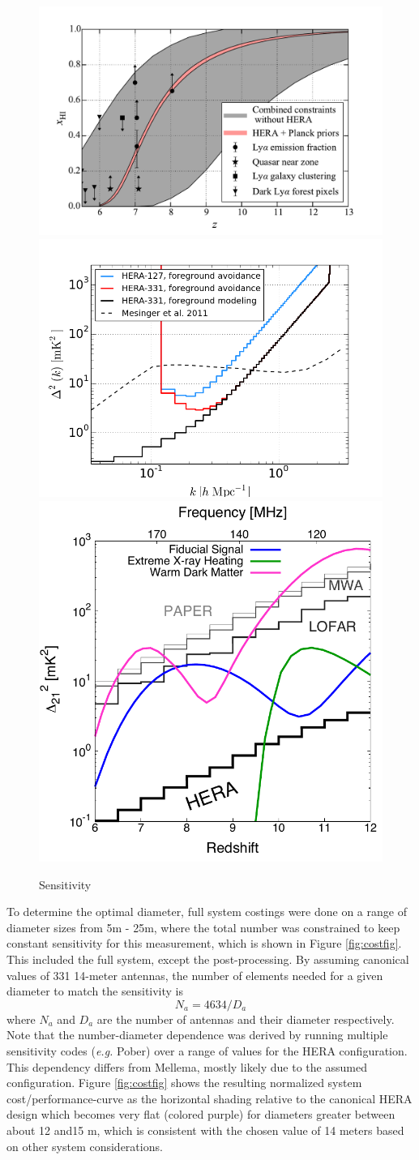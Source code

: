 \documentclass{article}
\begin{document}
\begin{figure}[t]
\centerline{
\includegraphics[width=.3\textwidth]{plots/ionHist.pdf}
\includegraphics[width=.3\textwidth]{plots/eor_pspec_2014.png}
\includegraphics[width=.3\textwidth]{plots/HERA_sensitivity.pdf}
}
\caption{\small Sensitivity
\label{fig:sensitivity}}
\end{figure}

To determine the optimal diameter, full system costings were done on a range of diameter sizes from 5m - 25m, where the total number was constrained to keep constant sensitivity for this measurement, which is shown in Figure \ref{fig:costfig}.  This included the full system, except the post-processing.  By assuming canonical values of 331 14-meter antennas, the number of elements needed for a given diameter to match the sensitivity is
\begin{equation}
N_a = 4634/D_a
\end{equation}
where $N_a$ and $D_a$ are the number of antennas and their diameter respectively.  Note that the number-diameter dependence was derived by running multiple sensitivity codes ({\em e.g.} Pober) over a range of values for the HERA configuration.  This dependency differs from Mellema, mostly likely due to the assumed configuration.
Figure \ref{fig:costfig} shows the resulting normalized system cost/performance-curve as the horizontal shading relative to the canonical HERA design 
which becomes very flat (colored purple) for diameters greater between about 12 and15 m, which is consistent with the chosen value of 14 meters based on other system considerations.
\end{document}
